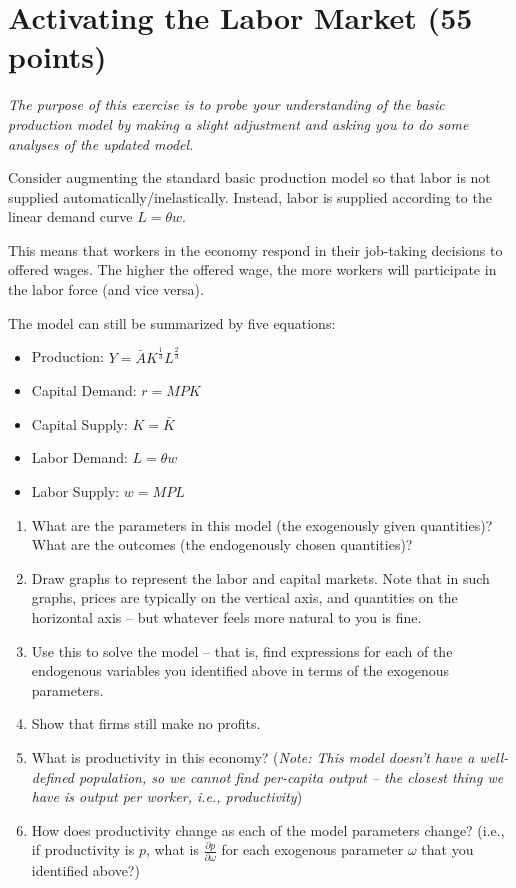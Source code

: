 \documentclass{article}
\begin{document}
\section*{Activating the Labor Market (55 points)}
\small{\textit{The purpose of this exercise is to probe your understanding of the basic production model by making a slight adjustment and asking you to do some analyses of the updated model.}}

Consider augmenting the standard basic production model so that labor is not supplied automatically/inelastically. Instead, labor is supplied according to the linear demand curve $L = \theta w$.

This means that workers in the economy respond in their job-taking decisions to offered wages. The higher the offered wage, the more workers will participate in the labor force (and vice versa).

The model can still be summarized by five equations:

\begin{itemize}
\item Production: $Y = \bar{A} K^\frac13 L^\frac23$
\item Capital Demand: $r = MPK$
\item Capital Supply: $K = \bar{K}$
\item Labor Demand: $L = \theta w$
\item Labor Supply: $w = MPL$
\end{itemize}

\begin{enumerate}
\item What are the parameters in this model (the exogenously given quantities)? What are the outcomes (the endogenously chosen quantities)?
\item Draw graphs to represent the labor and capital markets. Note that in such graphs, prices are typically on the vertical axis, and quantities on the horizontal axis -- but whatever feels more natural to you is fine.
\item Use this to solve the model -- that is, find expressions for each of the endogenous variables you identified above in terms of the exogenous parameters.
\item Show that firms still make no profits.
\item What is productivity in this economy? (\textit{Note: This model doesn't have a well-defined population, so we cannot find per-capita output -- the closest thing we have is output per worker, i.e., productivity})
\item How does productivity change as each of the model parameters change? (i.e., if productivity is $p$, what is $\frac{\partial p}{\partial \omega}$ for each exogenous parameter $\omega$ that you identified above?)
\end{enumerate}
\end{document}
